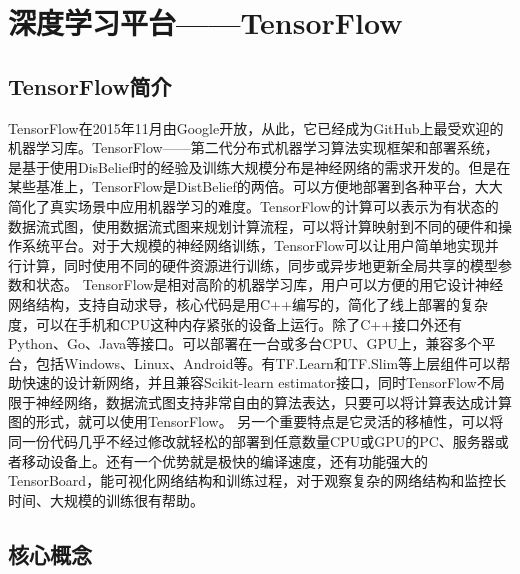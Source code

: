 \chapter{深度学习平台——TensorFlow}
	\section{TensorFlow简介}
	TensorFlow在2015年11月由Google开放，从此，它已经成为GitHub上最受欢迎的机器学习库。TensorFlow——第二代分布式机器学习算法实现框架和部署系统，是基于使用DisBelief时的经验及训练大规模分布是神经网络的需求开发的。但是在某些基准上，TensorFlow是DistBelief的两倍。可以方便地部署到各种平台，大大简化了真实场景中应用机器学习的难度。TensorFlow的计算可以表示为有状态的数据流式图，使用数据流式图来规划计算流程，可以将计算映射到不同的硬件和操作系统平台。对于大规模的神经网络训练，TensorFlow可以让用户简单地实现并行计算，同时使用不同的硬件资源进行训练，同步或异步地更新全局共享的模型参数和状态。
	TensorFlow是相对高阶的机器学习库，用户可以方便的用它设计神经网络结构，支持自动求导，核心代码是用C++编写的，简化了线上部署的复杂度，可以在手机和CPU这种内存紧张的设备上运行。除了C++接口外还有Python、Go、Java等接口。可以部署在一台或多台CPU、GPU上，兼容多个平台，包括Windows、Linux、Android等。有TF.Learn和TF.Slim等上层组件可以帮助快速的设计新网络，并且兼容Scikit-learn estimator接口，同时TensorFlow不局限于神经网络，数据流式图支持非常自由的算法表达，只要可以将计算表达成计算图的形式，就可以使用TensorFlow。
	另一个重要特点是它灵活的移植性，可以将同一份代码几乎不经过修改就轻松的部署到任意数量CPU或GPU的PC、服务器或者移动设备上。还有一个优势就是极快的编译速度，还有功能强大的TensorBoard，能可视化网络结构和训练过程，对于观察复杂的网络结构和监控长时间、大规模的训练很有帮助。
	\section{核心概念}
